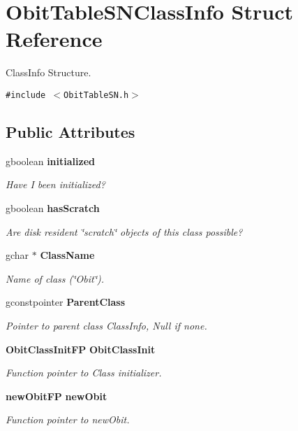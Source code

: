 \section{Obit\-Table\-SNClass\-Info Struct Reference}
\label{structObitTableSNClassInfo}
Class\-Info Structure.  


{\tt \#include $<$Obit\-Table\-SN.h$>$}

\subsection*{Public Attributes}
\begin{CompactItemize}
\item 
gboolean {\bf initialized}
\begin{CompactList}\small\item\em Have I been initialized? \item\end{CompactList}\item 
gboolean {\bf has\-Scratch}
\begin{CompactList}\small\item\em Are disk resident \char`\"{}scratch\char`\"{} objects of this class possible? \item\end{CompactList}\item 
gchar $\ast$ {\bf Class\-Name}
\begin{CompactList}\small\item\em Name of class (\char`\"{}Obit\char`\"{}). \item\end{CompactList}\item 
gconstpointer {\bf Parent\-Class}
\begin{CompactList}\small\item\em Pointer to parent class Class\-Info, Null if none. \item\end{CompactList}\item 
{\bf Obit\-Class\-Init\-FP} {\bf Obit\-Class\-Init}
\begin{CompactList}\small\item\em Function pointer to Class initializer. \item\end{CompactList}\item 
{\bf new\-Obit\-FP} {\bf new\-Obit}
\begin{CompactList}\small\item\em Function pointer to new\-Obit. \item\end{CompactList}\item 

\end{CompactItemize}
